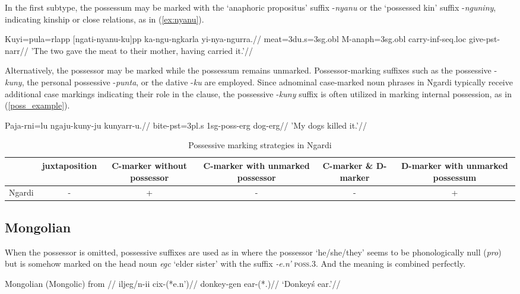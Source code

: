 In the first subtype, the possessum may be marked with the `anaphoric propositus' suffix -\textit{nyanu} or the `possessed kin' suffix -\textit{nguniny}, indicating kinship or close relations, as in (\ref{ex:nyanu}).

\ex \label{ex:nyanu}
\begingl
\gla Kuyi=pula=rlapp [ngati-nyanu-ku]pp ka-ngu-ngkarla yi-nya-ngurra.//
\glb meat=3du.s=3sg.obl M-anaph=3sg.obl carry-inf-seq.loc give-pst-narr//
\glft 'The two gave the meat to their mother, having carried it.'//
\endgl
\xe


Alternatively, the possessor may be marked while the possessum remains unmarked. Possessor-marking suffixes such as the possessive -\textit{kuny}, the personal possessive -\textit{punta}, or the dative -\textit{ku} are employed. Since adnominal case-marked noun phrases in Ngardi typically receive additional case markings indicating their role in the clause, the possessive -\textit{kuny} suffix is often utilized in marking internal possession, as in (\ref{poss_example}).

\ex \label{poss_example}
\begingl
\gla Paja-rni=lu ngaju-kuny-ju kunyarr-u.//
\glb bite-pst=3pl.s 1sg-poss-erg dog-erg//
\glft 'My dogs killed it.'//
\endgl
\xe


\begin{table}[h!]
	\centering
	\small
	\begin{tabular}{@{}cccccc@{}}
		\toprule
		& juxtaposition & \parbox{2.5cm}{C-marker without possessor} & \parbox{2.75cm}{C-marker with unmarked possessor} & \parbox{1.75cm}{C-marker \& D-marker} & \parbox{3cm}{D-marker with unmarked possessum} \\ \midrule
		Ngardi & - & + & - & - & + \\ \bottomrule
	\end{tabular}
	\caption{Possessive marking strategies in Ngardi}
\end{table}

\subsection{Mongolian}

When the possessor is omitted, possessive suffixes are used as in  where the possessor `he/she/they' seems to be phonologically null (\textit{pro}) but is somehow marked on the head noun \textit{egc} `elder sister' with the suffix \textit{-e.n'} \textsc{poss.3}. And the meaning is combined perfectly.

 \pex
\label{mongol2}
\glpreamble Mongolian (Mongolic) from \cite[138]{janhunen_mongolian_2012}//
\a
\label{mongola}
\begingl
\gla iljeg/n-ii cix-(*e.n')//
\glb donkey-gen ear-(*\Poss{}.\Third{})//
\glft `Donkey\'s ear.'//
\endgl


